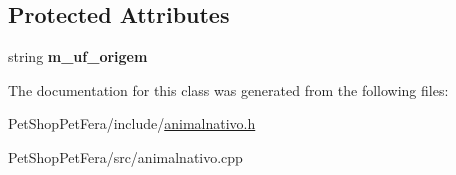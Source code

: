 \subsection*{Protected Attributes}
\begin{DoxyCompactItemize}
\item 
\mbox{\label{class_animal_nativo_ab0ae76915b494c83d78e9561bcbbf0a8}} 
string {\bfseries m\+\_\+uf\+\_\+origem}
\end{DoxyCompactItemize}


The documentation for this class was generated from the following files\+:\begin{DoxyCompactItemize}
\item 
Pet\+Shop\+Pet\+Fera/include/\mbox{\hyperlink{animalnativo_8h}{animalnativo.\+h}}\item 
Pet\+Shop\+Pet\+Fera/src/animalnativo.\+cpp\end{DoxyCompactItemize}
